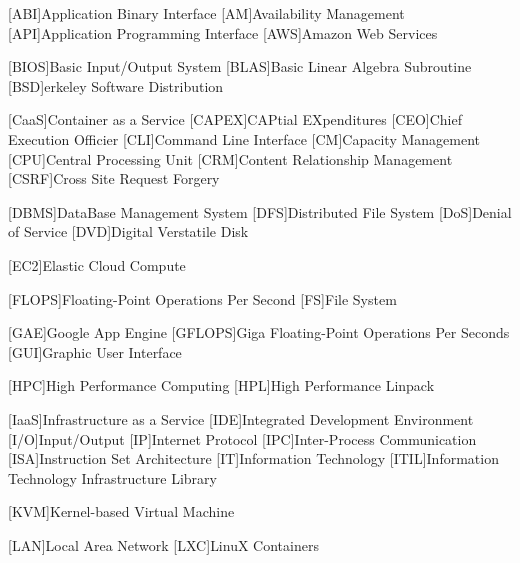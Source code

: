 %
%
[ABI]{Application Binary Interface}
[AM]{Availability Management}
[API]{Application Programming Interface}
[AWS]{Amazon Web Services}

[BIOS]{Basic Input/Output System}
[BLAS]{Basic Linear Algebra Subroutine}
[BSD]{erkeley Software Distribution}

[CaaS]{Container as a Service}
[CAPEX]{CAPtial EXpenditures}
[CEO]{Chief Execution Officier}
[CLI]{Command Line Interface}
[CM]{Capacity Management}
[CPU]{Central Processing Unit}
[CRM]{Content Relationship Management}
[CSRF]{Cross Site Request Forgery}

[DBMS]{DataBase Management System}
[DFS]{Distributed File System}
[DoS]{Denial of Service}
[DVD]{Digital Verstatile Disk}

[EC2]{Elastic Cloud Compute}

[FLOPS]{Floating-Point Operations Per Second}
[FS]{File System}

[GAE]{Google App Engine}
[GFLOPS]{Giga Floating-Point Operations Per Seconds}
[GUI]{Graphic User Interface}

[HPC]{High Performance Computing}
[HPL]{High Performance Linpack}

[IaaS]{Infrastructure as a Service}
[IDE]{Integrated Development Environment}
[I/O]{Input/Output}
[IP]{Internet Protocol}
[IPC]{Inter-Process Communication}
[ISA]{Instruction Set Architecture}
[IT]{Information Technology}
[ITIL]{Information Technology Infrastructure Library}

[KVM]{Kernel-based Virtual Machine}

[LAN]{Local Area Network}
[LXC]{LinuX Containers}

